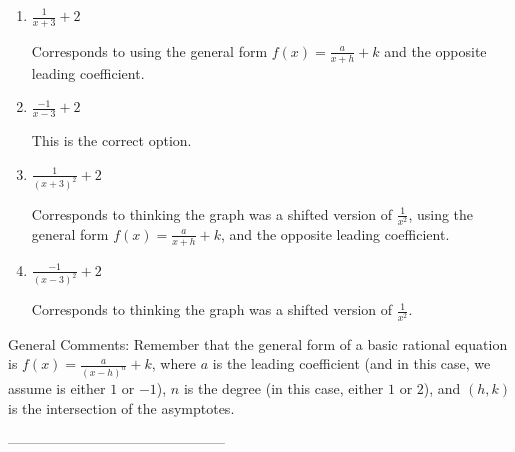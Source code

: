 \documentclass{article}[10pt]
\begin{document}
\begin{enumerate}[label=\Alph*.] 
\item $ \frac{1}{x + 3} + 2 $ 

 Corresponds to using the general form $f(x) = \frac{a}{x+h}+k$ and the opposite leading coefficient. 
\item $ \frac{-1}{x - 3} + 2 $ 

 This is the correct option. 
\item $ \frac{1}{(x + 3)^2} + 2 $ 

 Corresponds to thinking the graph was a shifted version of $\frac{1}{x^2}$, using the general form $f(x) = \frac{a}{x+h}+k$, and the opposite leading coefficient. 
\item $ \frac{-1}{(x - 3)^2} + 2 $ 

 Corresponds to thinking the graph was a shifted version of $\frac{1}{x^2}$. 
\end{enumerate} 
 
General Comments: Remember that the general form of a basic rational equation is $ f(x) = \frac{a}{(x-h)^n} + k$, where $a$ is the leading coefficient (and in this case, we assume is either $1$ or $-1$), $n$ is the degree (in this case, either $1$ or $2$), and $(h, k)$ is the intersection of the asymptotes.

-----------------------------------------------
\end{document}
